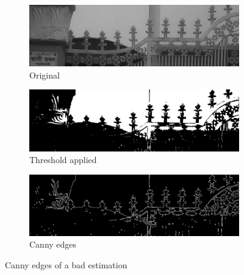 \begin{figure}
\begin{subfigure}{0.33\textwidth}
    \centering
    \includegraphics[width=0.9\linewidth]{./img/experiment/stage.9/02-small}
    \caption{Original}
\end{subfigure}
\begin{subfigure}{0.33\textwidth}
    \centering
    \includegraphics[width=0.9\linewidth]{./img/experiment/stage.10/02-small}
    \caption{Threshold applied}
\end{subfigure}
\begin{subfigure}{0.33\textwidth}
    \centering
    \includegraphics[width=0.9\linewidth]{./img/experiment/stage.11/02-small}
    \caption{Canny edges}
\end{subfigure}
\caption{Canny edges of a bad estimation}
\label{fig:CannyResult4}
\end{figure}

